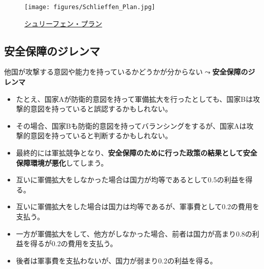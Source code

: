 \documentclass[
  xelatex,
  ja=standard]{bxjsarticle}
\providecommand{\tightlist}{%
  \setlength{\itemsep}{0pt}\setlength{\parskip}{0pt}}\usepackage{longtable,booktabs,array}
\begin{document}
\begin{figure}[htpb]

{\centering \texttt{[image: figures/Schlieffen\_Plan.jpg]}

}

\caption{\href{https://commons.wikimedia.org/wiki/File:Schlieffen_Plan.jpg}{シュリーフェン・プラン}}

\end{figure}

\hypertarget{ux5b89ux5168ux4fddux969cux306eux30b8ux30ecux30f3ux30de}{%
\subsection{安全保障のジレンマ}\label{ux5b89ux5168ux4fddux969cux306eux30b8ux30ecux30f3ux30de}}

他国が攻撃する意図や能力を持っているかどうかが分からない\(\leadsto\)\textbf{安全保障のジレンマ}\citep{jervis1978}

\begin{itemize}
\tightlist
\item
  たとえ、国家Aが防衛的意図を持って軍備拡大を行ったとしても、国家Bは攻撃的意図を持っていると誤認するかもしれない。
\item
  その場合、国家Bも防衛的意図を持ってバランシングをするが、国家Aは攻撃的意図を持っていると判断するかもしれない。
\item
  最終的には軍拡競争となり、\textbf{安全保障のために行った政策の結果として安全保障環境が悪化}してしまう。
\end{itemize}

\begin{tcolorbox}[enhanced jigsaw, coltitle=black, colbacktitle=quarto-callout-tip-color!10!white, colframe=quarto-callout-tip-color-frame, bottomrule=.15mm, toprule=.15mm, breakable, leftrule=.75mm, toptitle=1mm, left=2mm, arc=.35mm, bottomtitle=1mm, opacitybacktitle=0.6, titlerule=0mm, title=\textcolor{quarto-callout-tip-color}{\faLightbulb}\hspace{0.5em}{安全保障のジレンマ（シナリオ1）}, colback=white, opacityback=0, rightrule=.15mm]

\begin{itemize}
\tightlist
\item
  互いに軍備拡大をしなかった場合は国力が均等であるとして0.5の利益を得る。
\item
  互いに軍備拡大をした場合は国力は均等であるが、軍事費として0.2の費用を支払う。
\item
  一方が軍備拡大をして、他方がしなかった場合、前者は国力が高まり0.8の利益を得るが0.2の費用を支払う。
\item
  後者は軍事費を支払わないが、国力が弱まり0.2の利益を得る。
\end{itemize}

\end{tcolorbox}
\end{document}
